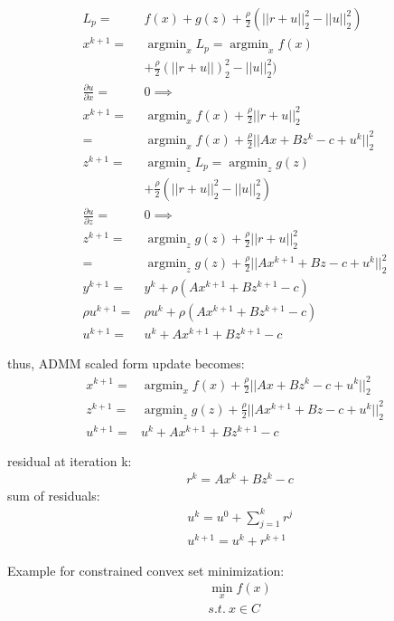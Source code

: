 \message{ !name(notebook.tex)}\documentclass[8pt]{report}
\DeclareMathOperator*{\argmin}{argmin}
\begin{document}
\begin{multicols*}{2}
  \vfill\null
  \columnbreak
  
  \begin{align*}
    L_p = & f(x) + g(z) + \frac{\rho}{2} (||r+u||_2^2 - ||u||_2^2)\\
    x^{k+1} = & \argmin_{x} L_p = \argmin_{x} f(x)\\
          & + \frac{\rho}{2}(||r+u||)_2^2-||u||_2^2)\\
    \frac{\partial u}{\partial x} = & 0 \implies\\
    x^{k+1} = & \argmin_{x} f(x) + \frac{\rho}{2}||r+u||_2^2\\
    = & \argmin_{x} f(x) + \frac{\rho}{2}||Ax + Bz^k - c + u^k||_2^2\\
    z^{k+1} = & \argmin_{z} L_p = \argmin_{z} g(z)\\
          & + \frac{\rho}{2}(||r+u||_2^2-||u||_2^2)\\
    \frac{\partial u}{\partial z} = & 0 \implies\\
    z^{k+1} = & \argmin_{z} g(z) + \frac{\rho}{2}||r+u||_2^2\\
          = & \argmin_{z} g(z) + \frac{\rho}{2}||Ax^{k+1} + Bz - c + u^k||_2^2\\
    y^{k+1} = & y^k + \rho (Ax^{k+1} +Bz^{k+1} - c)\\
    \rho u^{k+1} = & \rho u^k + \rho (Ax^{k+1} +Bz^{k+1} - c)\\
    u^{k+1} = & u^k + Ax^{k+1} +Bz^{k+1} - c
  \end{align*}

  thus, ADMM scaled form update becomes:
  \begin{align*}
    x^{k+1} = & \argmin_{x} f(x) + \frac{\rho}{2}||Ax + Bz^k - c + u^k||_2^2\\
    z^{k+1} = & \argmin_{z} g(z) + \frac{\rho}{2}||Ax^{k+1} + Bz - c + u^k||_2^2\\
    u^{k+1} = & u^k + Ax^{k+1} +Bz^{k+1} - c
  \end{align*}

  residual at iteration k:
  \begin{align*}
    &r^k = Ax^k + Bz^k - c
  \end{align*}
  sum of residuals:
  \begin{align*}
    &u^k = u^0 + \sum_{j=1}^{k} r^j\\
    &u^{k+1} = u^k + r^{k+1}
  \end{align*}


  \vfill\null
  \columnbreak
  
  Example for constrained convex set minimization:
  \begin{align*}
    &\min_x f(x)\\
    &s.t.\ x \in C
  \end{align*}


\end{multicols*}
\end{document}

